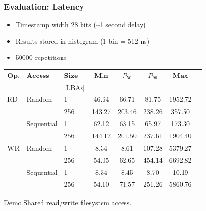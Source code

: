 \documentclass[%
  12pt,       				%
	t,                  %
	aspectratio=1610,   %
	unicode,						%
]{beamer}				    	%
\begin{document}
\begin{frame}
	\frametitle{Evaluation: Latency}
	\begin{itemize}
		\item Timestamp width 28 bits (\textasciitilde1 second delay)
		\item Results stored in histogram (1 bin = 512 ns)
		\item 50000 repetitions
	\end{itemize}

		\centering
		\begin{tabular}{lllSSSSS@{}}
			\toprule
			\textbf{Op.} & \textbf{Access} & \textbf{Size} & {\textbf{Min}} &
			{\boldmath $P_{50}$} &  {\boldmath $P_{99}$} & {\textbf{Max}} \\
			& & {[LBAs]} & & & & & \\
			\midrule
			RD  & Random     &   1 &  46.64 &  66.71 &    81.75 & 1952.72 \\
				&            & 256 & 143.27 & 203.46 &  238.26 & 357.50 \\
			\addlinespace
				& Sequential &   1 &  62.12 &  63.15 &   65.97 & 173.30 \\
				&            & 256 & 144.12 & 201.50 &  237.61 & 1904.40 \\
			\midrule
			WR  & Random     &   1 &   8.34 &    8.61 &   107.28 & 5379.27 \\
				&            & 256 &  54.05 &   62.65 &   454.14 & 6692.82 \\
			\addlinespace
				& Sequential &   1 &   8.34 &     8.45 &     8.70 &  10.19 \\
				&            & 256 &  54.10 &   71.57 &   251.26 & 5860.76 \\
			\bottomrule
		\end{tabular}

\end{frame}


\begin{frame}[c]
	\begin{block}{Demo}
		Shared read/write filesystem access.
	\end{block}
\end{frame}
\end{document}
